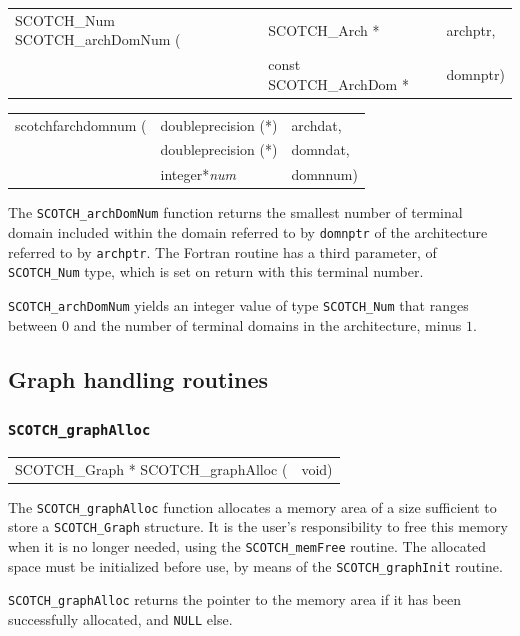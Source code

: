 \begin{itemize}
\progsyn

{\tt\begin{tabular}{l@{}ll}
SCOTCH\_Num SCOTCH\_archDomNum ( & SCOTCH\_Arch *          & archptr, \\
                                 & const SCOTCH\_ArchDom * & domnptr) \\
\end{tabular}}

{\tt\begin{tabular}{l@{}ll}
scotchfarchdomnum ( & doubleprecision (*) & archdat, \\
                    & doubleprecision (*) & domndat, \\
                    & integer*{\it num}   & domnnum)
\end{tabular}}

\progdes

The {\tt SCOTCH\_archDomNum} function returns the smallest number of
terminal domain included within the domain referred to by
{\tt domnptr} of the architecture referred to by {\tt archptr}.
The Fortran routine has a third parameter, of {\tt SCOTCH\_\lbt Num}
type, which is set on return with this terminal number.

\progret

{\tt SCOTCH\_archDomNum} yields an integer value of type
{\tt SCOTCH\_\lbt Num} that ranges between $0$ and the number of
terminal domains in the architecture, minus $1$.
\end{itemize}

\subsection{Graph handling routines}
\label{sec-lib-graph}

\subsubsection{{\tt SCOTCH\_graphAlloc}}

\begin{itemize}
\progsyn

{\tt\begin{tabular}{l@{}l}
SCOTCH\_Graph * SCOTCH\_graphAlloc ( & void)
\end{tabular}}

\progdes

The {\tt SCOTCH\_graphAlloc} function allocates a memory area of a
size sufficient to store a {\tt SCOTCH\_\lbt Graph} structure. It is
the user's responsibility to free this memory when it is no longer
needed, using the {\tt SCOTCH\_\lbt mem\lbt Free} routine. The
allocated space must be initialized before use, by means of the
{\tt SCOTCH\_\lbt graph\lbt Init} routine.

\progret

{\tt SCOTCH\_graphAlloc} returns the pointer to the memory area if it
has been successfully allocated, and {\tt NULL} else.
\end{itemize}

